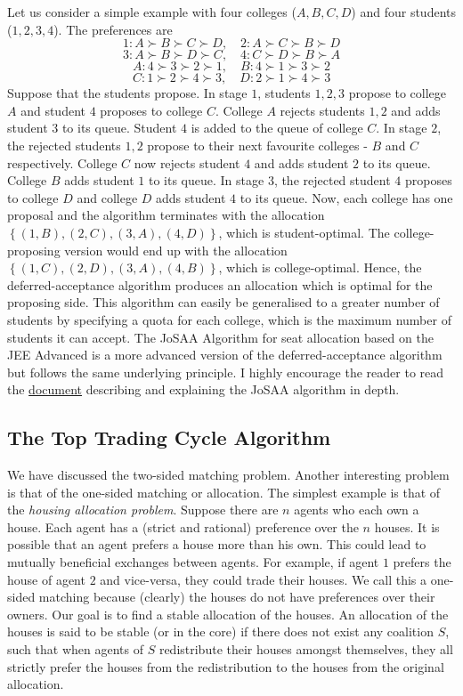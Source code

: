 \documentclass{article}
\theoremstyle{definition}
\begin{document}
Let us consider a simple example with four colleges ($A,B,C,D$) and four students ($1,2,3,4$). The preferences are
\[
    1 \colon A \succ B \succ C \succ D, \quad 2 \colon A \succ C \succ B \succ D
\]
\[
    3 \colon A \succ B \succ D \succ C, \quad 4 \colon C \succ D \succ B \succ A
\]
\[
    A \colon 4 \succ 3 \succ 2 \succ 1, \quad B \colon 4 \succ 1 \succ 3 \succ 2
\]
\[
    C \colon 1 \succ 2 \succ 4 \succ 3, \quad D \colon 2 \succ 1 \succ 4 \succ 3
\]
Suppose that the students propose. In stage $1$, students $1,2,3$ propose to college $A$ and student $4$ proposes to college $C$. College $A$ rejects students $1,2$ and adds student $3$ to its queue. Student $4$ is added to the queue of college $C$. In stage $2$, the rejected students $1,2$ propose to their next favourite colleges - $B$ and $C$ respectively. College $C$ now rejects student $4$ and adds student $2$ to its queue. College $B$ adds student $1$ to its queue. In stage $3$, the rejected student $4$ proposes to college $D$ and college $D$ adds student $4$ to its queue. Now, each college has one proposal and the algorithm terminates with the allocation $\left\{ (1,B) , (2,C) , (3,A) , (4,D) \right\}$, which is student-optimal. The college-proposing version would end up with the allocation $\left\{ (1,C) , (2,D), (3,A) , (4,B) \right\}$, which is college-optimal. Hence, the deferred-acceptance algorithm produces an allocation which is optimal for the proposing side. This algorithm can easily be generalised to a greater number of students by specifying a quota for each college, which is the maximum number of students it can accept. The JoSAA Algorithm for seat allocation based on the JEE Advanced is a more advanced version of the deferred-acceptance algorithm but follows the same underlying principle. I highly encourage the reader to read the \href{http://www.jeeadv.iitb.ac.in/sites/www2.iitb.ac.in.jeeadv/files/AlgorithmUsed4JointSeatAllocation.pdf}{document} describing and explaining the JoSAA algorithm in depth.

\subsection{The Top Trading Cycle Algorithm}

We have discussed the two-sided matching problem. Another interesting problem is that of the one-sided matching or allocation. The simplest example is that of the \textit{housing allocation problem}. Suppose there are $n$ agents who each own a house. Each agent has a (strict and rational) preference over the $n$ houses. It is possible that an agent prefers a house more than his own. This could lead to mutually beneficial exchanges between agents. For example, if agent $1$ prefers the house of agent $2$ and vice-versa, they could trade their houses. We call this a one-sided matching because (clearly) the houses do not have preferences over their owners. Our goal is to find a stable allocation of the houses. An allocation of the houses is said to be stable (or in the core) if there does not exist any coalition $S$, such that when agents of $S$ redistribute their houses amongst themselves, they all strictly prefer the houses from the redistribution to the houses from the original allocation. \medskip
\end{document}
